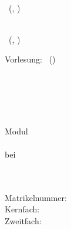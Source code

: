 

\ifdefined\layouttinyheader
\begin{small}
\noindent \meta \\ \autor\ (\matrikelnummer, \email)
\end{small}
\vspace{0.5cm}
\fi

\ifdefined\layoutsmallheader
\begin{small}
\noindent \meta \\ \autor\ (\matrikelnummer, \email)
\end{small}
\vskip 1.0cm
\begin{center}\begin{Large}\titel\end{Large}\end{center}
\vskip 0.5cm
\fi

\ifdefined\layoutzettel
\pagestyle{empty}
\newcommand{\header}{Vorlesung: \vorlesung \hfill  \autor \, (\matrikelnummer)\\ \zettel \hfill \gruppe \\ \datum}
\header
\fi

\ifdefined\layouttitlepage
\thispagestyle{empty}
\begin{titlepage}
\singlespacing

\quad \\[4cm]

\begin{center}
\begin{minipage}{0.8\linewidth}
\begin{center}
\textsc{\MakeLowercase{\autor}} \\[1cm]
{%
    \scshape\Large\onehalfspacing
    \titel \par}
\end{center}
\end{minipage}

\vskip 3.8cm
\emph{\art}
\end{center}

\vfill

\noindent\begin{minipage}{0.5\linewidth}
Modul \emph{\modul} \\
\veranstaltung \\
bei \dozentin \\
\institut \\
\universitaet
\end{minipage}
\begin{minipage}{0.5\linewidth}
\begin{flushright}
\email \\
Matrikelnummer: \matrikelnummer \\
Kernfach:  \\
Zweitfach: \zweitfach \\
\datum
\end{flushright}
\end{minipage}
\end{titlepage}
\fi

